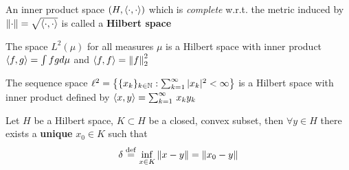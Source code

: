 \documentclass{article}
\begin{document}
\begin{definition}
	An inner product space $(H, \left<{\cdot},{\cdot}\right>)$ which is \textit{complete} w.r.t. the metric induced by $\left\|{\cdot}\right\|=\sqrt{\left<{\cdot},{\cdot}\right>}$ is called a \textbf{Hilbert space}
\end{definition}

\begin{example}[$L^2-$spaces]
	The space $L^2(\mu)$ for all measures $\mu$ is a Hilbert space with inner product $\left<{f},{g}\right>=\int fg d\mu$ and $\left<{f},{f}\right>=\left\|{f}\right\|_2^2$
\end{example}

\begin{example}[$l^2-$spaces]
	The sequence space
	$\ell^2=
		\left\{\{x_k\}_{k\in \mathbb{N}}:\sum_{k=1}^\infty |x_k|^2<\infty \right\}$
	is a Hilbert space with inner product defined by
	$
		\left<{x},{y}\right>=\sum_{k=1}^\infty \,{x_k y_k}
	$
\end{example}

\begin{theorem}
	\nextline
	\label{nearest point}
	Let $H$ be a Hilbert space, $K\subset H$ be a closed, convex subset, then $\forall y \in H$ there exists a {\bf{unique}} $x_0\in K$ such that
	$$
		\delta \overset{\rm{def}}{=} \inf_{x\in K} \left\|{x-y}\right\| = \left\|{x_0-y}\right\|
	$$
\end{theorem}
\end{document}
